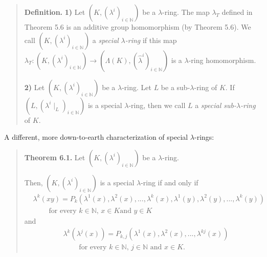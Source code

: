\documentclass[numbers=enddot,12pt,final,onecolumn,notitlepage]{scrartcl}%
\begin{document}
\begin{quote}
\textbf{Definition.} \textbf{1)} Let $\left(  K,\left(  \lambda^{i}\right)
_{i\in\mathbb{N}}\right)  $ be a $\lambda$-ring. The map $\lambda_{T}$ defined
in Theorem 5.6 is an additive group homomorphism (by Theorem 5.6). We call
$\left(  K,\left(  \lambda^{i}\right)  _{i\in\mathbb{N}}\right)  $ a
\textit{special }$\lambda$\textit{-ring} if this map $\lambda_{T}:\left(
K,\left(  \lambda^{i}\right)  _{i\in\mathbb{N}}\right)  \rightarrow\left(
\Lambda\left(  K\right)  ,\left(  \widehat{\lambda}^{i}\right)  _{i\in
\mathbb{N}}\right)  $ is a $\lambda$-ring homomorphism.

\textbf{2)} Let $\left(  K,\left(  \lambda^{i}\right)  _{i\in\mathbb{N}%
}\right)  $ be a $\lambda$-ring. Let $L$ be a sub-$\lambda$-ring of $K$. If
$\left(  L,\left(  \lambda^{i}\mid_{L}\right)  _{i\in\mathbb{N}}\right)  $ is
a special $\lambda$-ring, then we call $L$ a \textit{special sub-}$\lambda
$\textit{-ring} of $K$.
\end{quote}

A different, more down-to-earth characterization of special $\lambda$-rings:

\begin{quote}
\textbf{Theorem 6.1.} Let $\left(  K,\left(  \lambda^{i}\right)
_{i\in\mathbb{N}}\right)  $ be a $\lambda$-ring.

Then, $\left(  K,\left(  \lambda^{i}\right)  _{i\in\mathbb{N}}\right)  $ is a
special $\lambda$-ring if and only if%
\begin{align}
&  \lambda^{k}\left(  xy\right)  =P_{k}\left(  \lambda^{1}\left(  x\right)
,\lambda^{2}\left(  x\right)  ,...,\lambda^{k}\left(  x\right)  ,\lambda
^{1}\left(  y\right)  ,\lambda^{2}\left(  y\right)  ,...,\lambda^{k}\left(
y\right)  \right) \nonumber\\
&  \ \ \ \ \ \ \ \ \ \ \text{for every }k\in\mathbb{N}\text{, }x\in K\text{
and }y\in K \label{Lkxy}%
\end{align}
and%
\begin{align}
&  \lambda^{k}\left(  \lambda^{j}\left(  x\right)  \right)  =P_{k,j}\left(
\lambda^{1}\left(  x\right)  ,\lambda^{2}\left(  x\right)  ,...,\lambda
^{kj}\left(  x\right)  \right) \nonumber\\
&  \ \ \ \ \ \ \ \ \ \ \text{for every }k\in\mathbb{N}\text{, }j\in
\mathbb{N}\text{ and }x\in K. \label{LkLjx}%
\end{align}



\end{quote}
\end{document}
